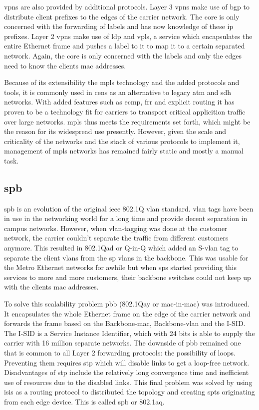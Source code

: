 \acp{vpn} are also provided by additional protocols. Layer 3 \acp{vpn} make use of \ac{bgp} to distribute client prefixes to the edges of the carrier network. The core is only concerned with the forwarding of labels and has now knowledge of these \acs{ip} prefixes. Layer 2 \acp{vpn} make use of \ac{ldp} and \ac{vpls}, a service which encapsulates the entire Ethernet frame and pushes a label to it to map it to a certain separated network. Again, the core is only concerned with the labels and only the edges need to know the clients \acs{mac} addresses. 

Because of its extensibility the \ac{mpls} technology and the added protocols and tools, it is commonly used in \acp{cen} as an alternative to legacy \acs{atm} and \acs{sdh} networks. With added features such as \ac{ecmp}, \ac{frr} and explicit routing it has proven to be a technology fit for carriers to transport critical applicition traffic over large networks. \ac{mpls} thus meets the requirements set forth, which might be the reason for its widespread use presently. However, given the scale and criticality of the networks and the stack of various protocols to implement it, management of \ac{mpls} networks has remained fairly static and mostly a manual task.


\subsection{\acs{spb}} %
\label{sub:spb}
\ac{spb} is an evolution of the original \acs{ieee} 802.1Q \ac{vlan} standard. \ac{vlan} tags have been in use in the networking world for a long time and provide decent separation in campus networks. However, when \ac{vlan}-tagging was done at the customer network, the carrier couldn't separate the traffic from different customers anymore. This resulted in 802.1Qad or Q-in-Q which added an S-\ac{vlan} tag to separate the client \acp{vlan} from the \ac{sp} \acp{vlan} in the backbone. This was usable for the Metro Ethernet networks for awhile but when \acp{sp} started providing this services to more and more customers, their backbone switches could not keep up with the clients \ac{mac} addresses.

To solve this scalability problem \ac{pbb} (802.1Qay or \ac{mac}-in-\ac{mac}) was introduced. It encapsulates the whole Ethernet frame on the edge of the carrier network and forwards the frame based on the Backbone-\ac{mac}, Backbone-\ac{vlan} and the I-SID. The I-SID is a Service Instance Identifier, which with 24 bits is able to supply the carrier with 16 million separate networks. The downside of \ac{pbb} remained one that is common to all Layer 2 forwarding protocols: the possibility of loops. Preventing them requires \ac{stp} which will disable links to get a loop-free network. Disadvantages of \ac{stp} include the relatively long convergence time and inefficient use of resources due to the disabled links. This final problem was solved by using \acs{isis} as a routing protocol to distributed the topology and creating \acp{spt} originating from each edge device. This is called \ac{spb} or 802.1aq.

